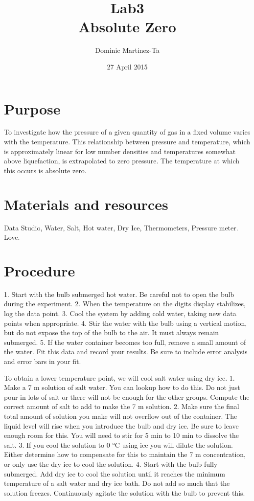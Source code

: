 \documentclass[12pt]{report}
\begin{document}
\title{Lab3 \\ Absolute Zero}
\author{Dominic Martinez-Ta}
\date{27 April 2015}
\maketitle

\section{Purpose}
	
	To investigate how the pressure of a given quantity of gas in a fixed volume varies with
the temperature. This relationship between pressure and temperature, which is approximately
linear for low number densities and temperatures somewhat above liquefaction, is
extrapolated to zero pressure. The temperature at which this occurs is absolute zero.

\section {Materials and resources}

Data Studio, Water, Salt, Hot water, Dry Ice, Thermometers, Pressure meter. Love.

\section{Procedure}
	1. Start with the bulb submerged hot water. Be careful not to open the bulb during the experiment.
	2. When the temperature on the digits display stabilizes, log the data point.
	3. Cool the system by adding cold water, taking new data points when appropriate.
	4. Stir the water with the bulb using a vertical motion, but do not expose the top of the bulb to the air. It must always remain submerged.
	5. If the water container becomes too full, remove a small amount of the water.
	Fit this data and record your results. Be sure to include error analysis and error bars in your fit.

	To obtain a lower temperature point, we will cool salt water using dry ice.
	1. Make a 7 m solution of salt water. You can lookup how to do this. Do not just pour in lots of salt or there will not be enough for the other groups. Compute the correct amount of salt to add to make the 7 m solution.
	2. Make sure the final total amount of solution you make will not overflow out of the container. The liquid level will rise when you introduce the bulb and dry ice. Be sure to leave enough room for this. You will need to stir for 5 min to 10 min to dissolve the salt.
	3. If you cool the solution to 0 °C using ice you will dilute the solution. Either determine how to compensate for this to maintain the 7 m concentration, or only use the dry ice to cool the solution.
	4. Start with the bulb fully submerged. Add dry ice to cool the solution until it reaches the minimum temperature of a salt water and dry ice bath. Do not add so much that the solution freezes. Continuously agitate the solution with the bulb to prevent this.
\end{document}
